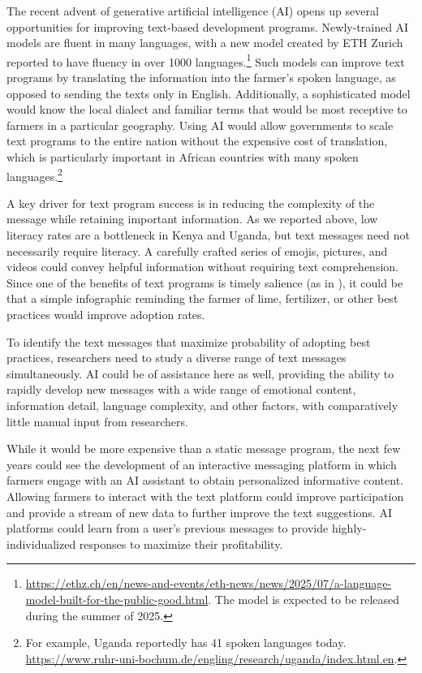 \documentclass[12pt]{article}
\begin{document}
The recent advent of generative artificial intelligence (AI) opens up several opportunities for improving text-based development programs. Newly-trained AI models are fluent in many languages, with a new model created by ETH Zurich reported to have fluency in over 1000 languages.\footnote{\url{https://ethz.ch/en/news-and-events/eth-news/news/2025/07/a-language-model-built-for-the-public-good.html}. The model is expected to be released during the summer of 2025.} Such models can improve text programs by translating the information into the farmer's spoken language, as opposed to sending the texts only in English. Additionally, a sophisticated model would know the local dialect and familiar terms that would be most receptive to farmers in a particular geography. Using AI would allow governments to scale text programs to the entire nation without the expensive cost of translation, which is particularly important in African countries with many spoken languages.\footnote{For example, Uganda reportedly has 41 spoken languages today. \url{https://www.ruhr-uni-bochum.de/engling/research/uganda/index.html.en}.}

A key driver for text program success is in reducing the complexity of the message while retaining important information. As we reported above, low literacy rates are a bottleneck in Kenya and Uganda, but text messages need not necessarily require literacy. A carefully crafted series of emojis, pictures, and videos could convey helpful information without requiring text comprehension. Since one of the benefits of text programs is timely salience (as in \textcite{carrion-yaguana_promoting_2020}), it could be that a simple infographic reminding the farmer of lime, fertilizer, or other best practices would improve adoption rates.

To identify the text messages that maximize probability of adopting best practices, researchers need to study a diverse range of text messages simultaneously. AI could be of assistance here as well, providing the ability to rapidly develop new messages with a wide range of emotional content, information detail, language complexity, and other factors, with comparatively little manual input from researchers.

While it would be more expensive than a static message program, the next few years could see the development of an interactive messaging platform in which farmers engage with an AI assistant to obtain personalized informative content. Allowing farmers to interact with the text platform could improve participation and provide a stream of new data to further improve the text suggestions. AI platforms could learn from a user's previous messages to provide highly-individualized responses to maximize their profitability. 
\end{document}
